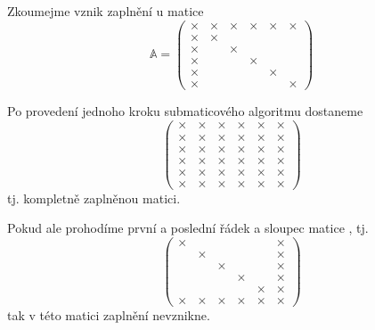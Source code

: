 \documentclass[../main.tex]{subfiles}
\begin{document}
\begin{example}
    Zkoumejme vznik zaplnění u matice
    \begin{equation*}
        \mathbb{A} = \begin{pmatrix}
            \times&\times&\times&\times&\times&\times \\
            \times&\times&&&& \\
            \times&&\times&&& \\
            \times&&&\times&& \\
            \times&&&&\times& \\
            \times&&&&&\times 
        \end{pmatrix}
    \end{equation*}

    Po provedení jednoho kroku submaticového algoritmu dostaneme
    \begin{equation*}
        \begin{pmatrix}
            \times&\times&\times&\times&\times&\times \\
            \times&\times&\times&\times&\times&\times \\
            \times&\times&\times&\times&\times&\times \\
            \times&\times&\times&\times&\times&\times \\
            \times&\times&\times&\times&\times&\times \\
            \times&\times&\times&\times&\times&\times 
        \end{pmatrix}
    \end{equation*}
    tj. kompletně zaplněnou matici.

    Pokud ale prohodíme první a poslední řádek a sloupec matice \matA, tj.
    \begin{equation*}
        \begin{pmatrix}
            \times&&&&&\times \\
            &\times&&&&\times \\
            &&\times&&&\times \\
            &&&\times&&\times \\
            &&&&\times&\times \\
            \times&\times&\times&\times&\times&\times 
        \end{pmatrix}
    \end{equation*}
    tak v této matici zaplnění nevznikne.
\end{example}
\end{document}
